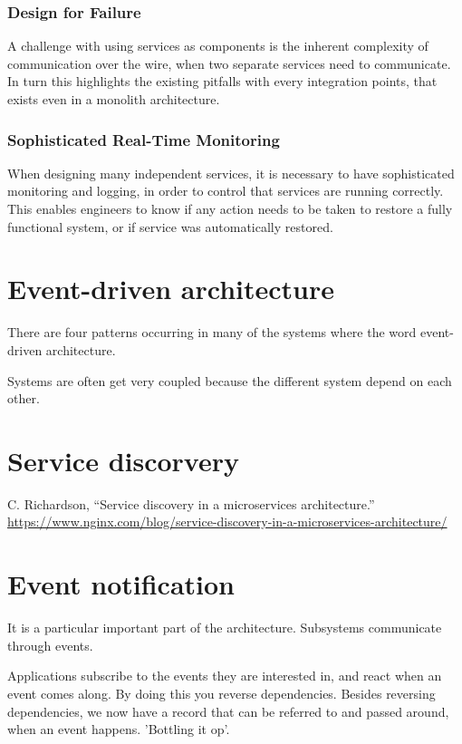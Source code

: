 \subsubsection*{Design for Failure}
A challenge with using services as components is the inherent complexity of communication over the wire, when two separate services need to communicate. In turn this highlights the existing pitfalls with every integration points, that exists even in a monolith architecture.

\subsubsection*{Sophisticated Real-Time Monitoring}
When designing many independent services, it is necessary to have sophisticated monitoring and logging, in order to control that services are running correctly. This enables engineers to know if any action needs to be taken to restore a fully functional system, or if service was automatically restored.


\section{Event-driven architecture}
There are four patterns occurring in many of the systems where the word event-driven architecture.

Systems are often get very coupled because the different system depend on each other.

\section{Service discorvery}
C. Richardson, “Service discovery in a microservices architecture.” 
\url{https://www.nginx.com/blog/service-discovery-in-a-microservices-architecture/}


\section{Event notification}
It is a particular important part of the architecture. Subsystems communicate through events.

Applications subscribe to the events they are interested in, and react when an event comes along. 
By doing this you reverse dependencies.
Besides reversing dependencies, we now have a record that can be referred to and passed around, when an event happens. 'Bottling it op'.


